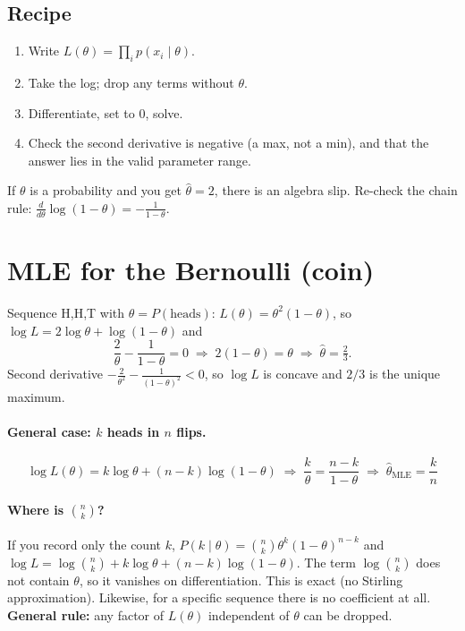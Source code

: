 \documentclass[11pt,a4paper]{article}
\begin{document}
\subsection{Recipe}
\begin{enumerate}[nosep]
  \item Write $L(\theta)=\prod_i p(x_i\mid\theta)$.
  \item Take the log; drop any terms without $\theta$.
  \item Differentiate, set to $0$, solve.
  \item Check the second derivative is negative (a max, not a min), and that the answer lies in the valid parameter range.
\end{enumerate}

\begin{pitfall}
If $\theta$ is a probability and you get $\hat\theta=2$, there is an algebra slip. Re-check the chain rule: $\frac{d}{d\theta}\log(1-\theta)=-\frac{1}{1-\theta}$.
\end{pitfall}

\section{MLE for the Bernoulli (coin)}
Sequence H,H,T with $\theta=P(\text{heads})$: $L(\theta)=\theta^2(1-\theta)$, so $\log L=2\log\theta+\log(1-\theta)$ and
\[
\frac{2}{\theta}-\frac{1}{1-\theta}=0\;\Rightarrow\;2(1-\theta)=\theta\;\Rightarrow\;\hat\theta=\tfrac23 .
\]
Second derivative $-\frac{2}{\theta^2}-\frac{1}{(1-\theta)^2}<0$, so $\log L$ is concave and $2/3$ is the unique maximum.

\paragraph{General case: $k$ heads in $n$ flips.}
\[
\log L(\theta)=k\log\theta+(n-k)\log(1-\theta)
\;\Rightarrow\;
\frac{k}{\theta}=\frac{n-k}{1-\theta}
\;\Rightarrow\;
\boxed{\hat\theta_{\text{MLE}}=\frac{k}{n}}
\]

\paragraph{Where is $\binom{n}{k}$?} If you record only the count $k$, $P(k\mid\theta)=\binom nk\theta^k(1-\theta)^{n-k}$ and
$\log L=\log\binom nk+k\log\theta+(n-k)\log(1-\theta)$. The term $\log\binom nk$ does not contain $\theta$, so it vanishes on differentiation. This is exact (no Stirling approximation). Likewise, for a specific sequence there is no coefficient at all. \textbf{General rule:} any factor of $L(\theta)$ independent of $\theta$ can be dropped.
\end{document}
